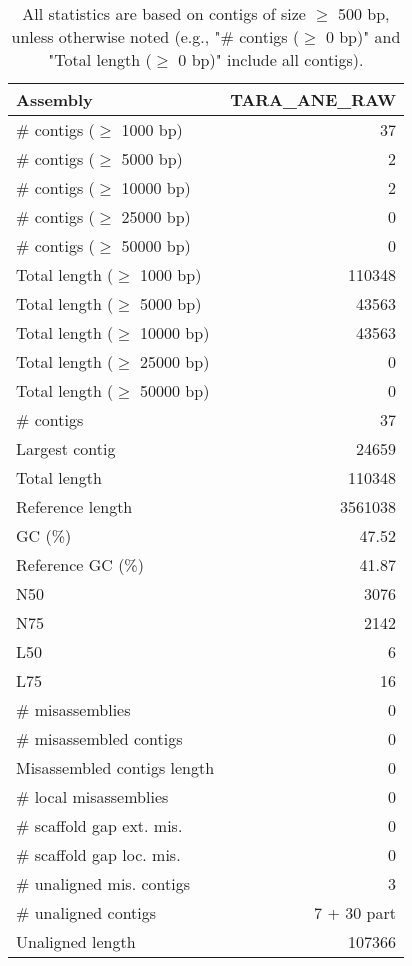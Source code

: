 \documentclass[12pt,a4paper]{article}
\begin{document}
\begin{table}[ht]
\begin{center}
\caption{All statistics are based on contigs of size $\geq$ 500 bp, unless otherwise noted (e.g., "\# contigs ($\geq$ 0 bp)" and "Total length ($\geq$ 0 bp)" include all contigs).}
\begin{tabular}{|l*{1}{|r}|}
\hline
Assembly & TARA\_ANE\_RAW \\ \hline
\# contigs ($\geq$ 1000 bp) & 37 \\ \hline
\# contigs ($\geq$ 5000 bp) & 2 \\ \hline
\# contigs ($\geq$ 10000 bp) & 2 \\ \hline
\# contigs ($\geq$ 25000 bp) & 0 \\ \hline
\# contigs ($\geq$ 50000 bp) & 0 \\ \hline
Total length ($\geq$ 1000 bp) & 110348 \\ \hline
Total length ($\geq$ 5000 bp) & 43563 \\ \hline
Total length ($\geq$ 10000 bp) & 43563 \\ \hline
Total length ($\geq$ 25000 bp) & 0 \\ \hline
Total length ($\geq$ 50000 bp) & 0 \\ \hline
\# contigs & 37 \\ \hline
Largest contig & 24659 \\ \hline
Total length & 110348 \\ \hline
Reference length & 3561038 \\ \hline
GC (\%) & 47.52 \\ \hline
Reference GC (\%) & 41.87 \\ \hline
N50 & 3076 \\ \hline
N75 & 2142 \\ \hline
L50 & 6 \\ \hline
L75 & 16 \\ \hline
\# misassemblies & 0 \\ \hline
\# misassembled contigs & 0 \\ \hline
Misassembled contigs length & 0 \\ \hline
\# local misassemblies & 0 \\ \hline
\# scaffold gap ext. mis. & 0 \\ \hline
\# scaffold gap loc. mis. & 0 \\ \hline
\# unaligned mis. contigs & 3 \\ \hline
\# unaligned contigs & 7 + 30 part \\ \hline
Unaligned length & 107366 \\ \hline

\end{tabular}
\end{center}
\end{table}
\end{document}
